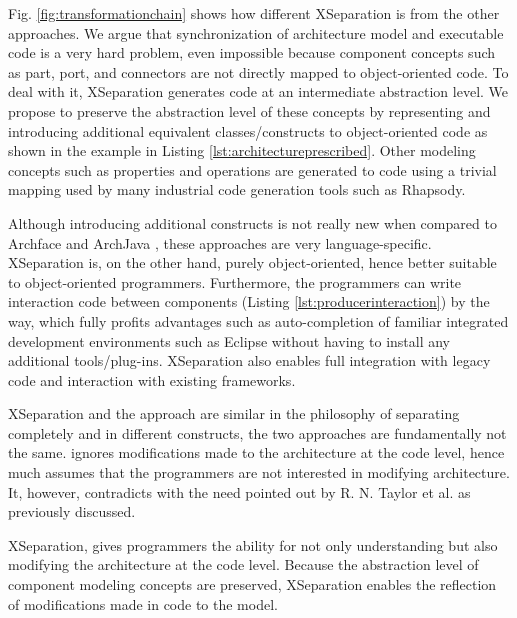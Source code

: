 Fig. \ref{fig:transformationchain} shows how different XSeparation is from the other approaches.
We argue that synchronization of architecture model and executable code is a very hard problem, even impossible because component concepts such as part, port, and connectors are not directly mapped to object-oriented code. 
To deal with it, XSeparation generates code at an intermediate abstraction level. 
We propose to preserve the abstraction level of these concepts by representing and introducing additional equivalent classes/constructs to object-oriented code as shown in the example in Listing \ref{lst:architectureprescribed}.
Other modeling concepts such as properties and operations are generated to code using a trivial mapping used by many industrial code generation tools such as Rhapsody.

Although introducing additional constructs is not really new when compared to Archface \cite{ubayashi2010archface} and ArchJava \cite{aldrich2002archjava}, these approaches are very language-specific.
XSeparation is, on the other hand, purely object-oriented, hence better suitable to object-oriented programmers. 
Furthermore, the programmers can write interaction code between components (Listing \ref{lst:producerinteraction}) by the way, which fully profits advantages such as auto-completion of familiar integrated development environments such as Eclipse without having to install any additional tools/plug-ins. 
XSeparation also enables full integration with legacy code and interaction with existing frameworks. 

XSeparation and the  approach are similar in the philosophy of separating completely  and  in different constructs, the two approaches are fundamentally not the same. 
 ignores modifications made to the architecture at the code level, hence much assumes that the programmers are not interested in modifying architecture.
It, however, contradicts with the need pointed out by R. N. Taylor et al. \cite{Taylor:2007:SDA:1253532.1254721} as previously discussed. 

XSeparation, 
gives programmers the ability for not only understanding but also modifying the architecture at the code level.
Because the abstraction level of component modeling concepts are preserved, XSeparation enables the reflection of modifications made in code to the model.

